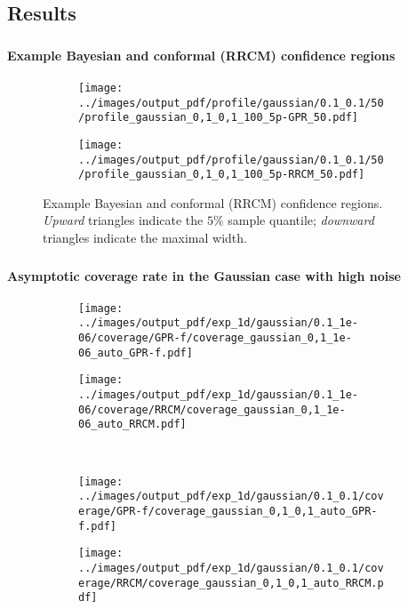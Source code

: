 \documentclass[t]{beamer}  %
\begin{document}
\subsection{Results} %
\label{sub:results}

\begin{frame}[c]\frametitle{\insertsection}
  \framesubtitle{Example Bayesian and conformal (RRCM) confidence regions}
  \begin{figure}%
    \centering
    \begin{subfigure}[b]{0.45\linewidth}
      \texttt{[image: ../images/output\_pdf/profile/gaussian/0.1\_0.1/50/profile\_gaussian\_0,1\_0,1\_100\_5p-GPR\_50.pdf]}
    \end{subfigure}%
    \begin{subfigure}[b]{0.45\linewidth}
      \texttt{[image: ../images/output\_pdf/profile/gaussian/0.1\_0.1/50/profile\_gaussian\_0,1\_0,1\_100\_5p-RRCM\_50.pdf]}
    \end{subfigure}
    \caption{Example Bayesian and conformal (RRCM) confidence regions.
      \textit{Upward} triangles indicate the $5\%$ sample quantile;
      \textit{downward} triangles indicate the maximal width.}
    \label{fig:gauss_1d_prof_gpr}
  \end{figure}
\end{frame}

\begin{frame}[t]\frametitle{\insertsection}
  \framesubtitle{Asymptotic coverage rate in the Gaussian case with high noise}
  \begin{figure}
    \centering
    \begin{subfigure}[b]{0.45\linewidth}
      \texttt{[image: ../images/output\_pdf/exp\_1d/gaussian/0.1\_1e-06/coverage/GPR-f/coverage\_gaussian\_0,1\_1e-06\_auto\_GPR-f.pdf]}
    \end{subfigure}%
    \begin{subfigure}[b]{0.45\linewidth}
      \texttt{[image: ../images/output\_pdf/exp\_1d/gaussian/0.1\_1e-06/coverage/RRCM/coverage\_gaussian\_0,1\_1e-06\_auto\_RRCM.pdf]}
    \end{subfigure}\\
    \begin{subfigure}[b]{0.45\linewidth}
      \texttt{[image: ../images/output\_pdf/exp\_1d/gaussian/0.1\_0.1/coverage/GPR-f/coverage\_gaussian\_0,1\_0,1\_auto\_GPR-f.pdf]}
    \end{subfigure}%
    \begin{subfigure}[b]{0.45\linewidth}
      \texttt{[image: ../images/output\_pdf/exp\_1d/gaussian/0.1\_0.1/coverage/RRCM/coverage\_gaussian\_0,1\_0,1\_auto\_RRCM.pdf]}
    \end{subfigure}\\
  \end{figure}
\end{frame}
\end{document}
